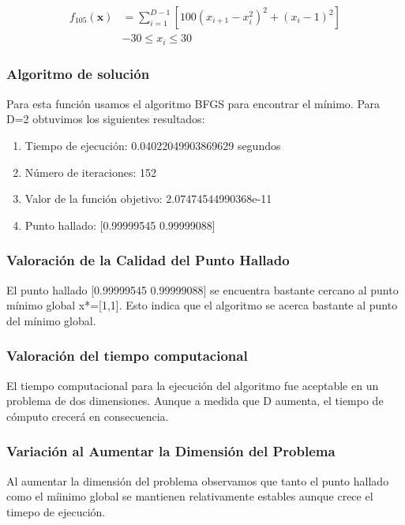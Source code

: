 \documentclass{article}
\begin{document}
\begin{equation*}
\begin{aligned}
    f_{105}(\mathbf{x}) &= \sum_{i=1}^{D-1} \left[ 100(x_{i+1} - x_i^2)^2 + (x_i - 1)^2 \right] \\
    &-30 \leq x_i \leq 30
\end{aligned}
\end{equation*}



\subsubsection{Algoritmo de solución}
Para esta función usamos el algoritmo BFGS para encontrar el mínimo. Para D=2 obtuvimos los siguientes resultados:

\begin{enumerate}
	\item Tiempo de ejecución: 0.04022049903869629 segundos
	\item Número de iteraciones: 152
	\item Valor de la función objetivo: 2.07474544990368e-11
        \item Punto hallado: [0.99999545 0.99999088]
\end{enumerate}


\subsubsection{Valoración de la Calidad del Punto Hallado}
El punto hallado [0.99999545 0.99999088] se encuentra bastante cercano al punto mínimo global x*=[1,1]. Esto indica que el algoritmo se acerca bastante al punto del  mínimo global.

\subsubsection{Valoración del tiempo computacional}
El tiempo computacional para la ejecución del algoritmo fue aceptable en un problema de dos dimensiones. Aunque a medida que D aumenta, el tiempo de cómputo crecerá en consecuencia.

\subsubsection{Variación al Aumentar la Dimensión del Problema}

Al aumentar la dimensión del problema observamos que tanto el punto hallado como el míinimo global se mantienen relativamente estables aunque crece  el timepo de ejecución.
\end{document}
